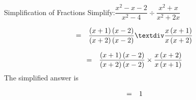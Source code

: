       \begin{wex}{ Simplification of Fractions }
  {Simplify:$\dfrac{{x}^{2}-x-2}{{x}^{2}-4}÷\dfrac{{x}^{2}+x}{{x}^{2}+2x}$} {
     \westep{} 
    \begin{equation}
    \begin{array}{ccc}& =& \dfrac{\left(x+1\right)\left(x-2\right)}{\left(x+2\right)\left(x-2\right)}÷\dfrac{x\left(x+1\right)}{x\left(x+2\right)}\hfill \end{array}
      \end{equation}
    \westep{} 

        
    \begin{equation}
    \begin{array}{ccc}& =& \dfrac{\left(x+1\right)\left(x-2\right)}{\left(x+2\right)\left(x-2\right)}\ensuremath{\times}\dfrac{x\left(x+2\right)}{x\left(x+1\right)}\hfill \end{array}
      \end{equation}
   \westep{}
      \label{m39392*id280081}The simplified answer is
     
    \begin{equation}
    \begin{array}{ccc}& =& 1\hfill \end{array}
      \end{equation}
   }
    \end{wex}
 
